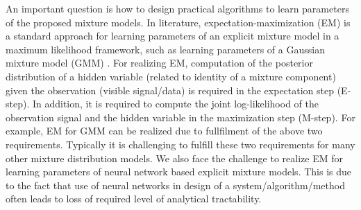 An important question is how to design practical algorithms to learn parameters of the proposed mixture models. In literature, expectation-maximization (EM) \cite{dempster1977maximum} is a standard approach for learning parameters of an explicit mixture model in a maximum likelihood framework, such as learning parameters of a Gaussian mixture model (GMM) \cite{Bishop:2006:PRM:1162264}. For realizing EM, computation of the
posterior distribution of a hidden variable (related to identity of a mixture component) given the observation
(visible signal/data) is required in the expectation step
(E-step). In addition, it is required to compute the joint log-likelihood of the observation signal and the hidden variable in the maximization step (M-step). For example, EM for GMM can be realized due to fullfilment of the above two requirements. Typically it is challenging to fulfill these two requirements for many other mixture distribution models. We also face the challenge to realize EM for learning parameters of neural network based explicit mixture models. This is due to the fact that use of neural networks in design of a system/algorithm/method often leads to loss of required level of analytical tractability. 



